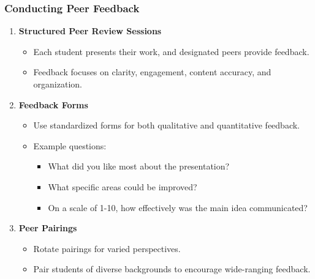\documentclass[aspectratio=169]{beamer}
\begin{document}
\begin{frame}[fragile]
    \frametitle{Conducting Peer Feedback}
    \begin{enumerate}
        \item \textbf{Structured Peer Review Sessions} 
        \begin{itemize}
            \item Each student presents their work, and designated peers provide feedback.
            \item Feedback focuses on clarity, engagement, content accuracy, and organization.
        \end{itemize}
        
        \item \textbf{Feedback Forms}
        \begin{itemize}
            \item Use standardized forms for both qualitative and quantitative feedback.
            \item Example questions:
            \begin{itemize}
                \item What did you like most about the presentation?
                \item What specific areas could be improved?
                \item On a scale of 1-10, how effectively was the main idea communicated?
            \end{itemize}
        \end{itemize}

        \item \textbf{Peer Pairings}
        \begin{itemize}
            \item Rotate pairings for varied perspectives.
            \item Pair students of diverse backgrounds to encourage wide-ranging feedback.
        \end{itemize}
    \end{enumerate}
\end{frame}
\end{document}
